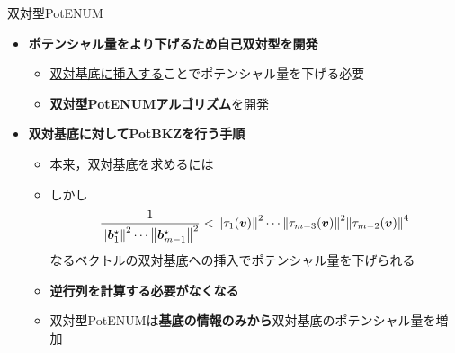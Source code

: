 \documentclass[12pt,aspectratio=169,xcolor=dvipsnames,table,dvipdfmx, leqno]{beamer}
\begin{document}
\begin{frame}{双対型PotENUM}
\begin{itemize}
    \item \textbf{ポテンシャル量をより下げるため\alert{自己双対型}を開発}
    \begin{itemize}
        \item \uline{双対基底に挿入する}ことでポテンシャル量を下げる必要
        \item \textbf{\alert{双対型PotENUMアルゴリズム}}を開発
    \end{itemize}
    \item \textbf{双対基底に対してPotBKZを行う手順}
    \begin{itemize}
        \item 本来，双対基底を求めるには
            \item しかし
            \begin{align*}
                \frac{1}{\norm{\bm{b}^\star_1}^2\cdots \norm{\bm{b}^\star_{m-1}}^2}<\norm{\tau_1(\bm{v})}^2\cdots \norm{\tau_{m-3}(\bm{v})}^2\norm{\tau_{m-2}(\bm{v})}^{4}
            \end{align*}
            なるベクトルの双対基底への挿入でポテンシャル量を下げられる
            \item \alert{\textbf{逆行列を計算する必要がなくなる}}
        \item 双対型PotENUMは\textbf{基底の情報のみから}双対基底のポテンシャル量を増加
    \end{itemize}
\end{itemize}
\end{frame}
\end{document}
